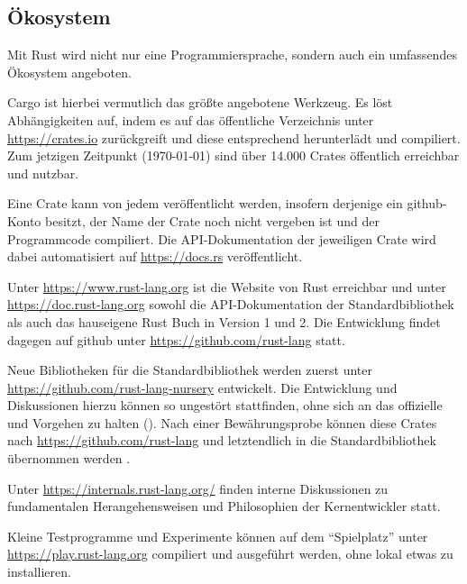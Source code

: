 \subsection{Ökosystem}

Mit Rust wird nicht nur eine Programmiersprache, sondern auch ein umfassendes Ökosystem angeboten.

Cargo ist hierbei vermutlich das größte angebotene Werkzeug.
Es löst Abhängigkeiten auf, indem es auf das öffentliche Verzeichnis unter \url{https://crates.io} zurückgreift und diese entsprechend herunterlädt und compiliert.
Zum jetzigen Zeitpunkt (\today) sind über 14.000 Crates öffentlich erreichbar und nutzbar.

Eine Crate kann von jedem veröffentlicht werden, insofern derjenige ein \gls{github}-Konto besitzt, der Name der Crate noch nicht vergeben ist und der Programmcode compiliert.
Die API-Dokumentation der jeweiligen Crate wird dabei automatisiert auf \url{https://docs.rs} veröffentlicht.

Unter \url{https://www.rust-lang.org} ist die Website von Rust erreichbar und unter \url{https://doc.rust-lang.org} sowohl die API-Dokumentation der Standardbibliothek als auch das hauseigene Rust Buch in Version 1 und 2.
Die Entwicklung findet dagegen auf \gls{github} unter \url{https://github.com/rust-lang} statt.

Neue Bibliotheken für die Standardbibliothek werden zuerst unter \url{https://github.com/rust-lang-nursery} entwickelt.
Die Entwicklung und Diskussionen hierzu können so ungestört stattfinden, ohne sich an das offizielle und  Vorgehen  zu halten ().
Nach einer Bewährungsprobe können diese Crates nach \url{https://github.com/rust-lang} und letztendlich in die Standardbibliothek übernommen werden \cite{rust:internals:1242_Recap}.

Unter \url{https://internals.rust-lang.org/} finden interne Diskussionen zu fundamentalen Herangehensweisen und Philosophien der Kernentwickler statt.


Kleine Testprogramme und Experimente können auf dem \enquote{Spielplatz} unter \url{https://play.rust-lang.org} compiliert und ausgeführt werden, ohne lokal etwas zu installieren.


